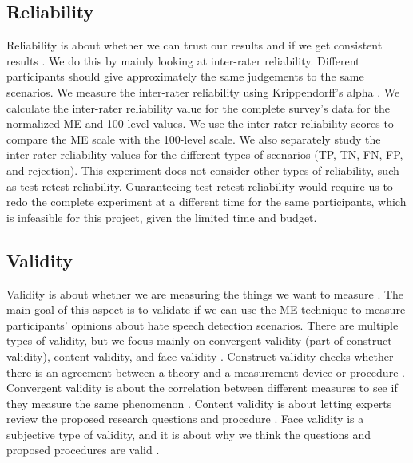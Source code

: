 \subsection{Reliability}
\label{sec:reliability}
Reliability is about whether we can trust our results and if we get consistent results \citep{fitzner2007reliability}.
%
We do this by mainly looking at inter-rater reliability.
%
Different participants should give approximately the same judgements to the same scenarios.
%
We measure the inter-rater reliability using Krippendorff's alpha \citep{maddalena2017crowdsourcing, krippendorff2004reliability}.
%
We calculate the inter-rater reliability value for the complete survey's data for the normalized ME and 100-level values.
%
We use the inter-rater reliability scores to compare the ME scale with the 100-level scale.
%
We also separately study the inter-rater reliability values for the different types of scenarios (TP, TN, FN, FP, and rejection).
%
This experiment does not consider other types of reliability, such as test-retest reliability.
%
Guaranteeing test-retest reliability would require us to redo the complete experiment at a different time for the same participants, which is infeasible for this project, given the limited time and budget.

\subsection{Validity}
\label{sec:analysis-validity}
Validity is about whether we are measuring the things we want to measure \citep{fitzner2007reliability}.
%
The main goal of this aspect is to validate if we can use the ME technique to measure participants' opinions about hate speech detection scenarios.
%
There are multiple types of validity, but we focus mainly on convergent validity (part of construct validity), content validity, and face validity \citep{fitzner2007reliability}.
%
Construct validity checks whether there is an agreement between a theory and a measurement device or procedure \citep{fitzner2007reliability}.
%
Convergent validity is about the correlation between different measures to see if they measure the same phenomenon \citep{fitzner2007reliability}.
%
Content validity is about letting experts review the proposed research questions and procedure \citep{fitzner2007reliability}.
%
Face validity is a subjective type of validity, and it is about why we think the questions and proposed procedures are valid \citep{fitzner2007reliability}.
%

